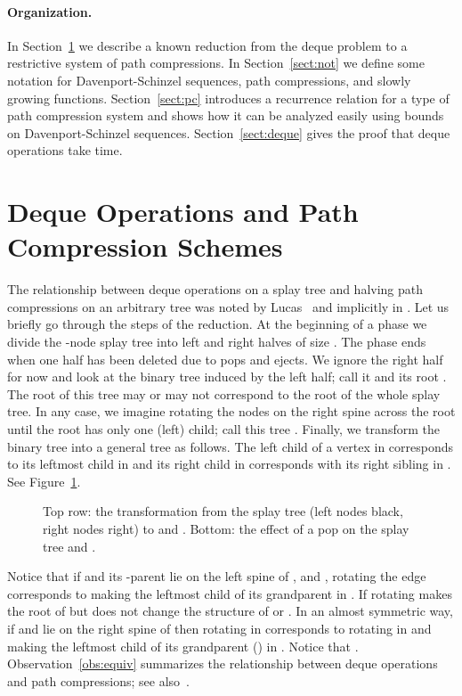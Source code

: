 \documentclass{article}
\begin{document}
\paragraph{Organization.} In Section~\ref{sect:equiv} we describe a known reduction \cite{Tar85,Sundar92,Lucas91} 
from the deque problem to a restrictive system of path compressions.  In Section~\ref{sect:not} we define
some notation for Davenport-Schinzel sequences, path compressions, and slowly growing functions.
Section~\ref{sect:pc} introduces a recurrence relation for a type of path compression system and shows how
it can be analyzed easily using bounds on Davenport-Schinzel sequences.  Section~\ref{sect:deque}
gives the proof that  deque operations take  time.


\section{Deque Operations and Path Compression Schemes}\label{sect:equiv}

The relationship between deque operations on a splay tree and halving path compressions
on an arbitrary tree was noted by Lucas~\cite{Lucas90,Lucas91} and implicitly in \cite{Tar85,Sundar92}.  
Let us briefly
go through the steps of the reduction.  At the beginning of a phase we divide the -node splay tree
into left and right halves of size .  The phase ends when one half has been deleted due to pops
and ejects.   We ignore the right half for now and look at the binary tree induced by the left half; call it  and its root .
The root of this tree may or may not correspond to the root of the whole splay tree.  In any case, we imagine
rotating the nodes on the right spine across the root until the root has only one (left) child; call this tree .
Finally, we transform the binary tree  into a general tree  as follows.  The left
child of a vertex in  corresponds to its leftmost child in  and its right child in  corresponds
with its right sibling in .  See Figure~\ref{fig:equiv}.
\begin{figure}[h!]
\begin{center}
\end{center}
\caption{\label{fig:equiv}Top row: the transformation from the splay tree (left nodes black, right nodes right) to  and .
Bottom: the effect of a pop on the splay tree and .}
\end{figure}
Notice that if  and its -parent  lie on the left spine of , and ,
rotating the edge 
 corresponds to making  the leftmost child of its grandparent in .  If  rotating
 makes  the root of  but does not change the structure of  or .  In an almost symmetric
way, if  and  lie on the right spine of  then rotating  in 
corresponds to rotating  in  and making  the leftmost child of its grandparent () in .
Notice that .  Observation~\ref{obs:equiv} summarizes the relationship
between deque operations and path compressions; see also~\cite{Lucas91,Sundar92}.
\end{document}
